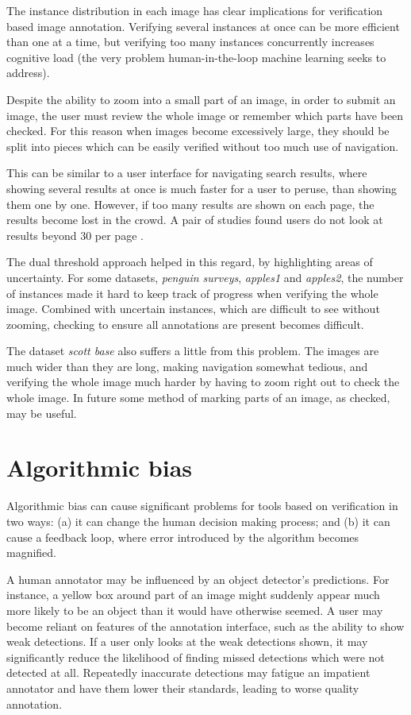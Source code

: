 The instance distribution in each image has clear implications for verification based image annotation. Verifying several instances at once can be more efficient than one at a time, but verifying too many instances concurrently increases cognitive load (the very problem human-in-the-loop machine learning seeks to address). 

Despite the ability to zoom into a small part of an image, in order to submit an image, the user must review the whole image or remember which parts have been checked. For this reason when images become excessively large, they should be split into pieces which can be easily verified without too much use of navigation.

This can be similar to a user interface for navigating search results, where showing several results at once is much faster for a user to peruse, than showing them one by one. However, if too many results are shown on each page, the results become lost in the crowd. A pair of studies found users do not look at results beyond 30 per page \cite{PunchoojitLumpapun2017, Zhou2007}.

The dual threshold approach helped in this regard, by highlighting areas of uncertainty. For some datasets, \emph{penguin surveys}, \emph{apples1} and \emph{apples2}, the number of instances made it hard to keep track of progress when verifying the whole image. Combined with uncertain instances, which are difficult to see without zooming, checking to ensure all annotations are present becomes difficult.

The dataset \emph{scott base} also suffers a little from this problem. The images are much wider than they are long, making navigation somewhat tedious, and verifying the whole image much harder by having to zoom right out to check the whole image. In future some method of marking parts of an image, as checked, may be useful.

\section{Algorithmic bias}
\label{sec:machine_bias}

Algorithmic bias can cause significant problems for tools based on verification in two ways: (a) it can change the human decision making process; and (b) it can cause a feedback loop, where error introduced by the algorithm becomes magnified.

A human annotator may be influenced by an object detector's predictions. For instance, a yellow box around part of an image might suddenly appear much more likely to be an object than it would have otherwise seemed. A user may become reliant on features of the annotation interface, such as the ability to show weak detections. If a user only looks at the weak detections shown, it may significantly reduce the likelihood of finding missed detections which were not detected at all. Repeatedly inaccurate detections may fatigue an impatient annotator and have them lower their standards, leading to worse quality annotation. 

